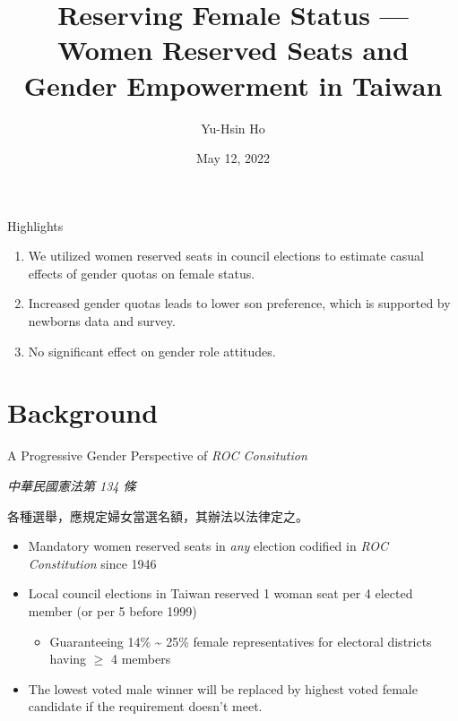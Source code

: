 \documentclass[
  10pt,
  ignorenonframetext,
  aspectratio=43,
]{beamer}
\title{Reserving Female Status --- Women Reserved Seats and Gender
Empowerment in Taiwan}
\author{Yu-Hsin Ho}
\date{May 12, 2022}
\institute{Department of Economics, National Taiwan University}
\providecommand{\tightlist}{%
  \setlength{\itemsep}{0pt}\setlength{\parskip}{0pt}}
\renewenvironment{quote}{\begin{customblockquote}\list{}{\rightmargin=0em\leftmargin=0em}%
\item\relax\color{blockquote-text}\ignorespaces}{\unskip\unskip\endlist\end{customblockquote}}
\begin{document}
\frame{\titlepage}

\begin{frame}
  \tableofcontents[hideallsubsections]
\end{frame}
\begin{frame}{Highlights}
\protect\hypertarget{highlights}{}
\begin{enumerate}
\tightlist
\item
  We utilized women reserved seats in council elections to estimate
  casual effects of gender quotas on female status.
\item
  Increased gender quotas leads to lower son preference, which is
  supported by newborns data and survey.
\item
  No significant effect on gender role attitudes.
\end{enumerate}
\end{frame}

\hypertarget{background}{%
\section{Background}\label{background}}

\begin{frame}{A Progressive Gender Perspective of \emph{ROC
Consitution}}
\protect\hypertarget{a-progressive-gender-perspective-of-roc-consitution}{}
\begin{quote}
\emph{中華民國憲法第 134 條}

各種選舉，應規定婦女當選名額，其辦法以法律定之。
\end{quote}

\begin{itemize}
\tightlist
\item
  Mandatory women reserved seats in \emph{any} election codified in
  \emph{ROC Constitution} since 1946
\item
  Local council elections in Taiwan reserved 1 woman seat per 4 elected
  member (or per 5 before 1999)

  \begin{itemize}
  \tightlist
  \item
    Guaranteeing 14\% \textasciitilde{} 25\% female representatives for
    electoral districts having \(\geq\) 4 members
  \end{itemize}
\item
  The lowest voted male winner will be replaced by highest voted female
  candidate if the requirement doesn't meet.
\end{itemize}
\end{frame}
\end{document}
